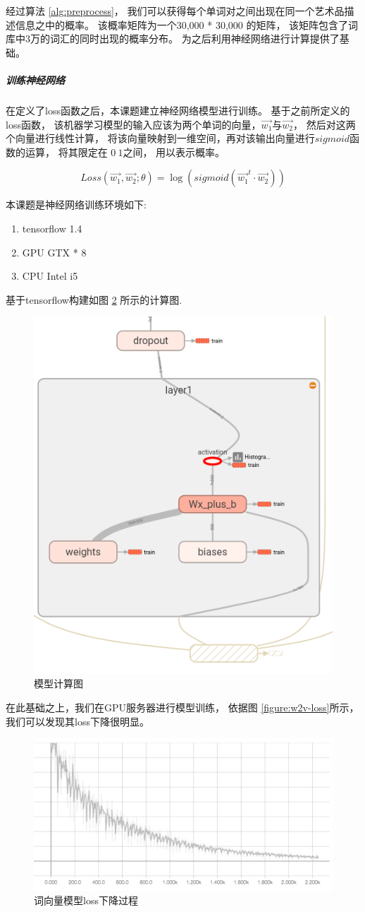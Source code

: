 经过算法 \ref{alg:preprocess}， 我们可以获得每个单词对之间出现在同一个艺术品描述信息之中的概率。 该概率矩阵为一个30,000 * 30,000 的矩阵， 该矩阵包含了词库中3万的词汇的同时出现的概率分布。 为之后利用神经网络进行计算提供了基础。

\subparagraph{训练神经网络} 在定义了loss函数之后，本课题建立神经网络模型进行训练。 基于之前所定义的loss函数， 该机器学习模型的输入应该为两个单词的向量，$\vec{w_1}$与$\vec{w_2}$， 然后对这两个向量进行线性计算， 将该向量映射到一维空间，再对该输出向量进行$sigmoid$函数的运算， 将其限定在 $0 ~ 1$之间， 用以表示概率。 

\begin{equation} \label{eq:pipeline}
Loss(\vec{w_1}, \vec{w_2}; \theta) = \log(sigmoid(\vec{w_1}^t \cdot \vec{w_2}))
\end{equation}

本课题是神经网络训练环境如下: 

\begin{enumerate}
\item{tensorflow 1.4}
\item{GPU GTX * 8}
\item{CPU Intel i5}
\end{enumerate}

基于tensorflow构建如图 \ref{figure:computing-graph} 所示的计算图. 

\begin{figure}[!htbp]
\centering
\includegraphics[width=0.45\linewidth,keepaspectratio]{data/chapter-1-1/computing-graph.png}
\caption{模型计算图}
\label{figure:computing-graph}
\end{figure}


在此基础之上，我们在GPU服务器进行模型训练， 依据图 \ref{figure:w2v-loss}所示， 我们可以发现其loss下降很明显。 

\begin{figure}[!htbp]
\centering
\includegraphics[width=0.45\linewidth,keepaspectratio]{data/chapter-1-1/w2v-loss.png}
\caption{词向量模型loss下降过程}
\label{figure:computing-graph}
\end{figure}

